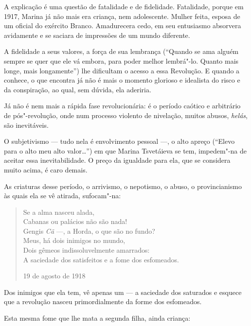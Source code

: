 A explicação é uma questão de fatalidade e de fidelidade. Fatalidade,
porque em 1917, Marina já não mais era criança, nem adolescente. Mulher
feita, esposa de um oficial do exército Branco. Amadurecera cedo, em seu
entusiasmo absorvera avidamente e se saciara de impressões de um mundo
diferente.

A fidelidade a seus valores, a força de sua lembrança (``Quando se ama
alguém sempre se quer que ele vá embora, para poder melhor lembrá"-lo.
Quanto mais longe, mais longamente'') lhe dificultam o acesso a essa
Revolução. E quando a conhece, o que encontra já não é mais o momento
glorioso e idealista do risco e da conspiração, ao qual, sem dúvida, ela
aderiria.

Já não é nem mais a rápida fase revolucionária: é o período caótico e
arbitrário de pós"-revolução, onde num processo violento de nivelação,
muitos abusos, \emph{helás}, são inevitáveis.

O subjetivismo --- tudo nela é envolvimento pessoal ---, o alto apreço
(``Elevo para o alto meu alto valor\ldots{}'') em que Marina Tsvetáieva se
tem, impedem"-na de aceitar essa inevitabilidade. O preço da igualdade
para ela, que se considera muito acima, é caro demais.

As criaturas desse período, o arrivismo, o nepotismo, o abuso, o
provincianismo às quais ela se vê atirada, sufocam"-na:

\begin{verse}
Se a alma nasceu alada, \\
Cabanas ou palácios não são nada! \\
Gengis \emph{Cã} ---, a Horda, o que são no fundo? \\[8pt]
Meus, há dois inimigos no mundo, \\
Dois gêmeos indissoluvelmente amarrados: \\
A saciedade dos satisfeitos e a fome \qb{}dos esfomeados. 
\begin{flushright}
19 de agosto de 1918
\end{flushright}
\end{verse}

Dos inimigos que ela tem, vê apenas um --- a saciedade dos saturados e
esquece que a revolução nasceu primordialmente da forme dos esfomeados.

Esta mesma fome que lhe mata a segunda filha, ainda criança:

